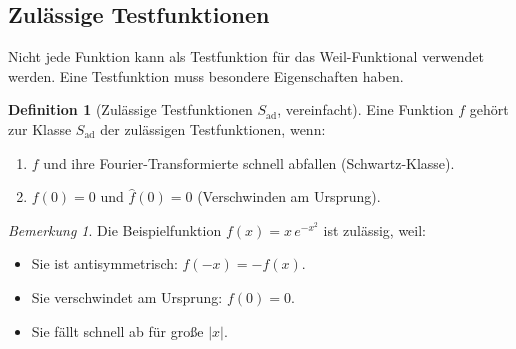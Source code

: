 \documentclass[11pt,a4paper]{article}
\theoremstyle{plain}
\theoremstyle{definition}
\newtheorem{definition}[theorem]{Definition}
\theoremstyle{remark}
\newtheorem{remark}[theorem]{Bemerkung}
\newcommand{\Sad}{S_{\mathrm{ad}}}
\begin{document}
	\subsection{Zul\"assige Testfunktionen}
	
	Nicht jede Funktion kann als Testfunktion f\"ur das Weil-Funktional verwendet werden.
	Eine Testfunktion muss besondere Eigenschaften haben.
	
	\begin{definition}[Zul\"assige Testfunktionen $\Sad$, vereinfacht]
		Eine Funktion $f$ geh\"ort zur Klasse $\Sad$ der zul\"assigen Testfunktionen, wenn:
		\begin{enumerate}
			\item $f$ und ihre Fourier-Transformierte schnell abfallen (Schwartz-Klasse).
			\item $f(0) = 0$ und $\hat{f}(0) = 0$ (Verschwinden am Ursprung).
		\end{enumerate}
	\end{definition}
	
	\begin{center}
	\end{center}
	
	\begin{remark}
		Die Beispielfunktion $f(x) = x\, e^{-x^2}$ ist zul\"assig, weil:
		\begin{itemize}
			\item Sie ist antisymmetrisch: $f(-x) = -f(x)$.
			\item Sie verschwindet am Ursprung: $f(0) = 0$.
			\item Sie f\"allt schnell ab f\"ur gro\ss e $|x|$.
		\end{itemize}
	\end{remark}
	
	
	
\end{document}

